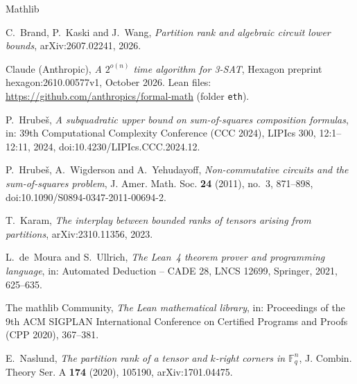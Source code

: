 \documentclass[11pt]{amsart}
\theoremstyle{remark}
\begin{document}
\begin{thebibliography}{Mathlib}

C.~Brand, P.~Kaski and J.~Wang, \emph{Partition rank and algebraic circuit lower bounds}, arXiv:2607.02241,
2026.

Claude (Anthropic), \emph{A $2^{o(n)}$ time algorithm for 3-SAT}, Hexagon preprint hexagon:2610.00577v1,
October 2026. Lean files: \url{https://github.com/anthropics/formal-math} (folder \texttt{eth}).

P.~Hrube\v{s}, \emph{A subquadratic upper bound on sum-of-squares composition formulas}, in: 39th
Computational Complexity Conference (CCC 2024), LIPIcs 300, 12:1--12:11, 2024,
doi:10.4230/LIPIcs.CCC.2024.12.

P.~Hrube\v{s}, A.~Wigderson and A.~Yehudayoff, \emph{Non-commutative circuits and the sum-of-squares
problem}, J. Amer. Math. Soc. \textbf{24} (2011), no.~3, 871--898, doi:10.1090/S0894-0347-2011-00694-2.

T.~Karam, \emph{The interplay between bounded ranks of tensors arising from partitions}, arXiv:2310.11356,
2023.

L.~de~Moura and S.~Ullrich, \emph{The Lean~4 theorem prover and programming language}, in: Automated
Deduction -- CADE 28, LNCS 12699, Springer, 2021, 625--635.

The mathlib Community, \emph{The Lean mathematical library}, in: Proceedings of the 9th ACM SIGPLAN
International Conference on Certified Programs and Proofs (CPP 2020), 367--381.

E.~Naslund, \emph{The partition rank of a tensor and $k$-right corners in $\mathbb{F}_q^n$}, J. Combin.
Theory Ser. A \textbf{174} (2020), 105190, arXiv:1701.04475.

\end{thebibliography}
\end{document}
